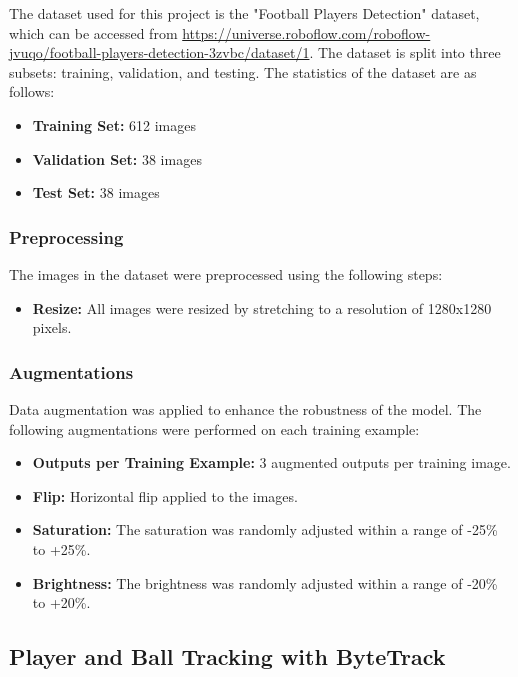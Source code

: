The dataset used for this project is the "Football Players Detection" dataset, which can be accessed from \url{https://universe.roboflow.com/roboflow-jvuqo/football-players-detection-3zvbc/dataset/1}. The dataset is split into three subsets: training, validation, and testing. The statistics of the dataset are as follows:

\begin{itemize}
    \item \textbf{Training Set:} 612 images
    \item \textbf{Validation Set:} 38 images
    \item \textbf{Test Set:} 38 images
\end{itemize}

\subsubsection{Preprocessing}
The images in the dataset were preprocessed using the following steps:
\begin{itemize}
    \item \textbf{Resize:} All images were resized by stretching to a resolution of 1280x1280 pixels.
\end{itemize}

\subsubsection{Augmentations}
Data augmentation was applied to enhance the robustness of the model. The following augmentations were performed on each training example:

\begin{itemize}
    \item \textbf{Outputs per Training Example:} 3 augmented outputs per training image.
    \item \textbf{Flip:} Horizontal flip applied to the images.
    \item \textbf{Saturation:} The saturation was randomly adjusted within a range of -25\% to +25\%.
    \item \textbf{Brightness:} The brightness was randomly adjusted within a range of -20\% to +20\%.
\end{itemize}

\subsection{Player and Ball Tracking with ByteTrack}


